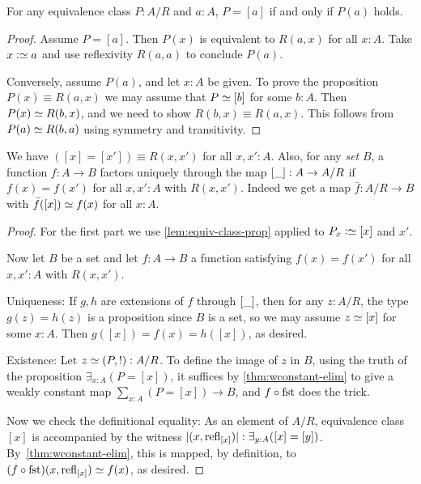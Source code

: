 \begin{lemma}\label{lem:equiv-class-prop}
  For any equivalence class $P : A/R$ and $a:A$,
  $P = [a]$ if and only if $P(a)$ holds.
\end{lemma}
\begin{proof}
  Assume $P = [a]$. Then $P(x)$ is equivalent to $R(a,x)$ for all $x:A$.
  Take $x\defeq a$ and use reflexivity $R(a,a)$ to conclude $P(a)$.

  Conversely, assume $P(a)$, and let $x:A$ be given.
  To prove the proposition $P(x) \equiv R(a,x)$ we may assume that
  $P \jdeq [b]$ for some $b:A$.
  Then $P(x) \jdeq R(b,x)$, and we need to show $R(b,x) \equiv R(a,x)$.
  This follows from $P(a) \jdeq R(b,a)$ using symmetry and transitivity.
\end{proof}
\begin{theorem}\label{thm:quotient-property}
  We have $([x] = [x']) \equiv R(x,x')$ for all $x,x':A$.
  Also, for any \emph{set} $B$, a
  function $f : A \to B$ factors uniquely through the map $[\_] : A \to A/R$ if
  $f(x)=f(x')$ for all $x,x':A$ with $R(x,x')$.
  Indeed we get a map $\bar f : A/R \to B$ with
  $\bar f([x]) \jdeq f(x)$ for all $x:A$.
\end{theorem}
\begin{proof}
  For the first part we use \cref{lem:equiv-class-prop} applied to $P_x \defeq [x]$ and $x'$.

  Now let $B$ be a set and let $f : A \to B$ a function satisfying $f(x)=f(x')$
  for all $x,x':A$ with $R(x,x')$.

  Uniqueness: If $g,h$ are extensions of $f$ through $[\_]$, then
  for any $z:A/R$, the type $g(z)=h(z)$ is a proposition since $B$ is
  a set, so we may assume $z\jdeq [x]$ for some $x:A$. Then
  $g([x]) = f(x) = h([x])$, as desired.

  Existence: Let $z\jdeq(P,!):A/R$. To define the image of $z$ in $B$,
  using the truth of the proposition $\exists_{x:A}(P = [x])$,
  it suffices by \cref{thm:wconstant-elim}
  to give a weakly constant map $\sum_{x:A}(P = [x]) \to B$,
  and $f \circ \fst$ does the trick.

  Now we check the definitional equality: As an element of $A/R$,
  equivalence class $[x]$ is accompanied by the witness
  $\lvert(x, \mathrm{refl}_{[x]})\rvert : \exists_{y:A}([x] = [y])$.
  By~\cref{thm:wconstant-elim}, this is mapped, by definition,
  to $(f \circ \fst)(x, \refl{[x]}) \jdeq f(x)$, as desired.
\end{proof}

